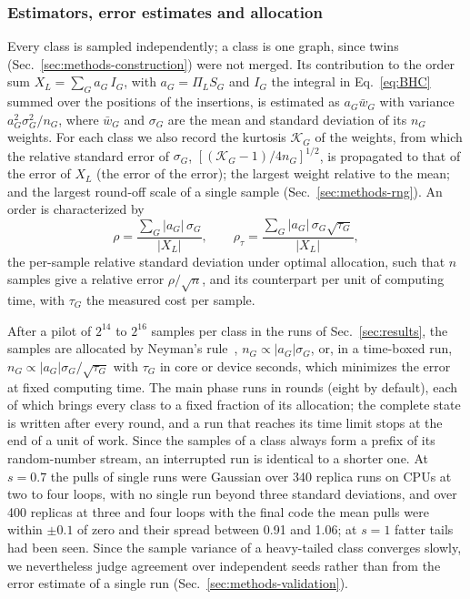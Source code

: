 \subsubsection{Estimators, error estimates and allocation}
\label{sec:methods-estimators}

Every class is sampled independently; a class is one graph, since twins (Sec.~\ref{sec:methods-construction}) were not
merged. Its contribution to the order sum
$X_L=\sum_G a_G\,I_G$, with $a_G=\Pi_L S_G$ and $I_G$ the integral in Eq.~\eqref{eq:BHC} summed over the positions of the insertions, is estimated as
$a_G\bar w_G$ with variance $a_G^2\sigma_G^2/n_G$, where $\bar w_G$ and $\sigma_G$ are the mean and standard deviation of its
$n_G$ weights. For each class we also record the kurtosis $\mathcal K_G$ of the weights, from which the relative standard error
of $\sigma_G$, $[(\mathcal K_G-1)/4n_G]^{1/2}$, is propagated to that of the error of $X_L$ (the error of the error); the largest
weight relative to the mean; and the largest round-off scale of a single sample (Sec.~\ref{sec:methods-rng}). An order is
characterized by
\begin{equation}
\rho=\frac{\sum_G|a_G|\,\sigma_G}{|X_L|},\qquad \rho_\tau=\frac{\sum_G|a_G|\,\sigma_G\sqrt{\tau_G}}{|X_L|},
\label{eq:rho}
\end{equation}
the per-sample relative standard deviation under optimal allocation, such that $n$ samples give a relative error
$\rho/\sqrt n$, and its counterpart per unit of computing time, with $\tau_G$ the measured cost per sample.

After a pilot of $2^{14}$ to $2^{16}$ samples per class in the runs of Sec.~\ref{sec:results}, the samples are allocated by Neyman's
rule~\cite{Neyman1934}, $n_G\propto|a_G|\sigma_G$, or, in a time-boxed
run, $n_G\propto|a_G|\sigma_G/\sqrt{\tau_G}$ with $\tau_G$ in core or device seconds, which minimizes the error at fixed
computing time. The main phase runs in rounds (eight by default), each of which brings every class to a fixed fraction of
its allocation; the complete state is written after every round, and a run that reaches its time limit stops at the end of
a unit of work. Since the samples of a class always form a prefix of its random-number stream, an interrupted run is
identical to a shorter one. At $s=0.7$ the pulls of single runs were Gaussian over 340 replica runs on CPUs at two to four loops,
with no single run beyond three standard deviations, and over 400 replicas at three and four loops with the final code
the mean pulls were within $\pm0.1$ of zero and their spread between 0.91 and 1.06; at $s=1$ fatter tails had been
seen. Since the sample variance of a heavy-tailed class converges slowly, we nevertheless judge agreement over
independent seeds rather than from the error estimate of a single run (Sec.~\ref{sec:methods-validation}).

